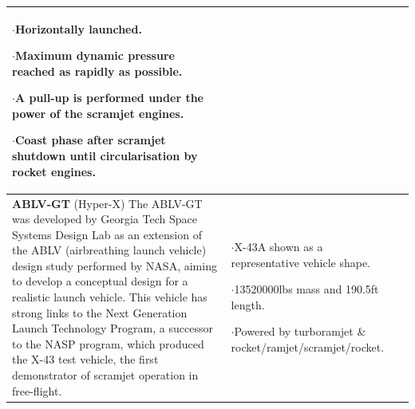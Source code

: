 \begin{xltabular}{\linewidth}{|X|X|X|}
$\cdot$Horizontally launched. 

$\cdot$Maximum dynamic pressure reached as rapidly as possible. 

$\cdot$A pull-up is performed under the power of the scramjet engines. 

$\cdot$Coast phase after scramjet shutdown until circularisation by rocket engines.

 \\ 
\hline \small\textbf{ABLV-GT} (Hyper-X)\cite{Bradford2000, HyperX} 
\newline \newline 
The ABLV-GT was developed by Georgia Tech Space Systems Design Lab as an extension of the ABLV (airbreathing launch vehicle) design study performed by NASA, aiming to develop a conceptual design for a realistic launch vehicle. This vehicle has strong links to the Next Generation Launch Technology Program, a successor to the NASP program, which produced the X-43 test vehicle, the first demonstrator of scramjet operation in free-flight.
&
\small
{}

$\cdot$X-43A shown as a representative vehicle shape.

$\cdot$13520000lbs mass and 190.5ft length.

$\cdot$Powered by turboramjet \& rocket/ramjet/scramjet/rocket.


\end{xltabular}
